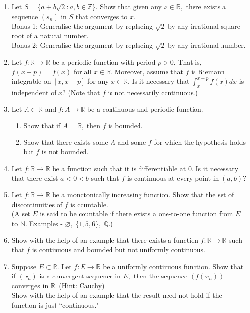 \documentclass{article}
\let\emptyset\varnothing
\begin{document}
\begin{enumerate}
	\item Let $S = \{a + b\sqrt{2} : a, b \in \mathbb{Z}\}.$ Show that given any $x \in \mathbb{R},$ there exists a sequence $(s_n)$ in $S$ that converges to $x.$\\
	Bonus 1: Generalise the argument by replacing $\sqrt{2}$ by any irrational square root of a natural number.\\
	Bonus 2: Generalise the argument by replacing $\sqrt{2}$ by any irrational number.
	\item Let $f:\mathbb{R} \to \mathbb{R}$ be a periodic function with period $p > 0.$ That is, $f(x+p) = f(x)$ for all $x \in \mathbb{R}.$ Moreover, assume that $f$ is Riemann integrable on $[x, x+p]$ for any $x \in \mathbb{R}.$ Is it necessary that $\displaystyle\int_{x}^{x+p} f(x) dx $ is independent of $x?$ (Note that $f$ is not necessarily continuous.)
	\item Let $A \subset \mathbb{R}$ and $f:A\to\mathbb{R}$ be a continuous and periodic function.
	\begin{enumerate}[nosep] 
		\item Show that if $A = \mathbb{R},$ then $f$ is bounded.
		\item Show that there exists some $A$ and some $f$ for which the hypothesis holds but $f$ is not bounded.
	\end{enumerate}
	\item Let $f:\mathbb{R} \to \mathbb{R}$ be a function such that it is differentiable at $0.$ Is it necessary that there exist $a < 0 < b$ such that $f$ is continuous at every point in $(a, b)?$
	\item Let $f:\mathbb{R}\to\mathbb{R}$ be a monotonically increasing function. Show that the set of discontinuities of $f$ is countable.\\
	(A set $E$ is said to be countable if there exists a one-to-one function from $E$ to $\mathbb{N}.$ Examples - $\emptyset,\;\{1, 5, 6\},\;\mathbb{Q}.$)
	\item Show with the help of an example that there exists a function $f:\mathbb{R} \to \mathbb{R}$ such that $f$ is continuous and bounded but not uniformly continuous.
	\item Suppose $E \subset \mathbb{R}.$ Let $f:E \to \mathbb{R}$ be a uniformly continuous function. Show that if $(x_n)$ is a convergent sequence in $E,$ then the sequence $(f(x_n))$ converges in $\mathbb{R}.$ \hfill (Hint: Cauchy)\\
	Show with the help of an example that the result need not hold if the function is just ``continuous."

\end{enumerate}
\end{document}
